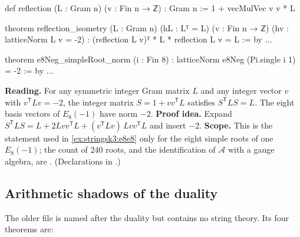 \begin{leanbox}
\begin{leancode}
def reflection (L : Gram n) (v : Fin n → ℤ) : Gram n :=
  1 + vecMulVec v v * L

theorem reflection_isometry (L : Gram n) (hL : Lᵀ = L) (v : Fin n → ℤ)
    (hv : latticeNorm L v = -2) :
    (reflection L v)ᵀ * L * reflection L v = L := by ...

theorem e8Neg_simpleRoot_norm (i : Fin 8) :
    latticeNorm e8Neg (Pi.single i 1) = -2 := by ...
\end{leancode}
\textbf{Reading.} For any symmetric integer Gram matrix $L$ and any integer vector $v$ with
$v^{\mathsf T}Lv=-2$, the integer matrix $S=1+vv^{\mathsf T}L$ satisfies $S^{\mathsf T}LS=L$.
The eight basis vectors of $E_8(-1)$ have norm $-2$. \textbf{Proof idea.} Expand
$S^{\mathsf T}LS=L+2Lvv^{\mathsf T}L+(v^{\mathsf T}Lv)\,Lvv^{\mathsf T}L$ and insert $-2$.
\textbf{Scope.} This is the statement used in \cref{ex:stringsk3:e8e8} only for the eight simple
roots of one $E_8(-1)$; the count of $240$ roots, and the identification of $\mathcal A$ with a
gauge algebra, are \TL. (Declarations in
.)
\end{leanbox}

\subsection{Arithmetic shadows of the duality}
The older file  is named after the
duality but contains no string theory. Its four theorems are:

